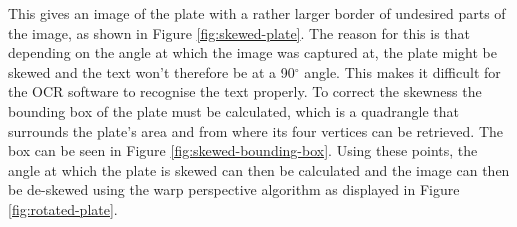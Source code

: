 This gives an image of the plate with a rather larger border of undesired parts of the image, as shown in Figure \ref{fig:skewed-plate}. The reason for this is that depending on the angle at which the image was captured at, the plate might be skewed and the text won't therefore be at a 90$^{\circ}$ angle. This makes it difficult for the OCR software to recognise the text properly. To correct the skewness the bounding box of the plate must be calculated, which is a quadrangle that surrounds the plate's area and from where its four vertices can be retrieved. The box can be seen in Figure \ref{fig:skewed-bounding-box}. Using these points, the angle at which the plate is skewed can then be calculated and the image can then be de-skewed using the warp perspective algorithm \cite{warpperspective} as displayed in Figure \ref{fig:rotated-plate}. 

